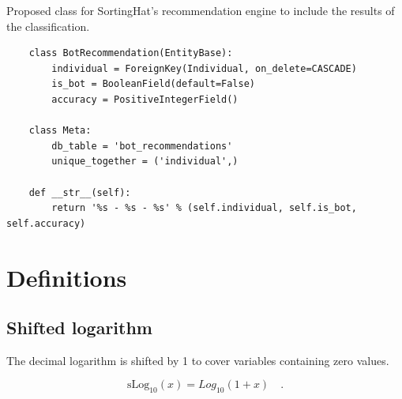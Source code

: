 \documentclass[a4paper, 12pt]{book}
\begin{document}
\begin{listing}[h!]
    \caption{Proposed class for SortingHat's recommendation engine to include the results of the classification.}{}
    \label{lst:sh-recommend}
    \begin{verbatim}
    class BotRecommendation(EntityBase):
        individual = ForeignKey(Individual, on_delete=CASCADE)
        is_bot = BooleanField(default=False)
        accuracy = PositiveIntegerField()

    class Meta:
        db_table = 'bot_recommendations'
        unique_together = ('individual',)

    def __str__(self):
        return '%s - %s - %s' % (self.individual, self.is_bot, self.accuracy)
    \end{verbatim}
\end{listing}




\cleardoublepage
\appendix

\chapter{Definitions}
\label{app:app-definitions}

\section{Shifted logarithm}
\label{sec:form-one-plus-log10}

The decimal logarithm is shifted by 1 to cover variables containing zero values.

\begin{center}
    \begin{equation}
        \mathrm{sLog_{10}}(x) = Log_{10}(1 + x) \quad .
    \end{equation}
\end{center}
\end{document}
